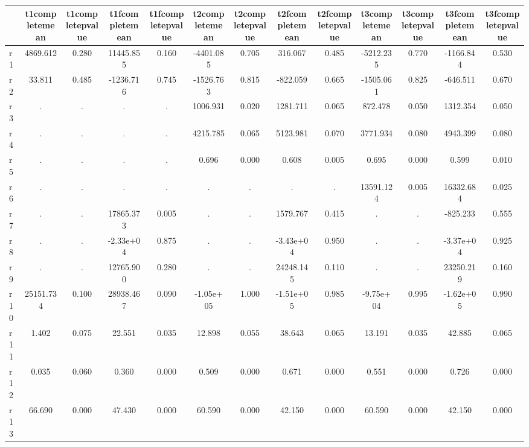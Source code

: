 \begin{table}[htbp]
\begin{tabular}{lcccccccccccc} \hline \hline
 & t1completemean  & t1completepvalue  & t1fcompletemean  & t1fcompletepvalue  & t2completemean  & t2completepvalue  & t2fcompletemean  & t2fcompletepvalue  & t3completemean  & t3completepvalue  & t3fcompletemean  & t3fcompletepvalue  \\  \hline 
r1 &  4869.612 &     0.280 & 11445.855 &     0.160 & -4401.085 &     0.705 &   316.067 &     0.485 & -5212.235 &     0.770 & -1166.844 &     0.530 \\  
r2 &    33.811 &     0.485 & -1236.716 &     0.745 & -1526.763 &     0.815 &  -822.059 &     0.665 & -1505.061 &     0.825 &  -646.511 &     0.670 \\  
r3 &         . &         . &         . &         . &  1006.931 &     0.020 &  1281.711 &     0.065 &   872.478 &     0.050 &  1312.354 &     0.050 \\  
r4 &         . &         . &         . &         . &  4215.785 &     0.065 &  5123.981 &     0.070 &  3771.934 &     0.080 &  4943.399 &     0.080 \\  
r5 &         . &         . &         . &         . &     0.696 &     0.000 &     0.608 &     0.005 &     0.695 &     0.000 &     0.599 &     0.010 \\  
r6 &         . &         . &         . &         . &         . &         . &         . &         . & 13591.124 &     0.005 & 16332.684 &     0.025 \\  
r7 &         . &         . & 17865.373 &     0.005 &         . &         . &  1579.767 &     0.415 &         . &         . &  -825.233 &     0.555 \\  
r8 &         . &         . & -2.33e+04 &     0.875 &         . &         . & -3.43e+04 &     0.950 &         . &         . & -3.37e+04 &     0.925 \\  
r9 &         . &         . & 12765.900 &     0.280 &         . &         . & 24248.145 &     0.110 &         . &         . & 23250.219 &     0.160 \\  
r10 & 25151.734 &     0.100 & 28938.467 &     0.090 & -1.05e+05 &     1.000 & -1.51e+05 &     0.985 & -9.75e+04 &     0.995 & -1.62e+05 &     0.990 \\  
r11 &     1.402 &     0.075 &    22.551 &     0.035 &    12.898 &     0.055 &    38.643 &     0.065 &    13.191 &     0.035 &    42.885 &     0.065 \\  
r12 &     0.035 &     0.060 &     0.360 &     0.000 &     0.509 &     0.000 &     0.671 &     0.000 &     0.551 &     0.000 &     0.726 &     0.000 \\  
r13 &    66.690 &     0.000 &    47.430 &     0.000 &    60.590 &     0.000 &    42.150 &     0.000 &    60.590 &     0.000 &    42.150 &     0.000 \\  
\hline \hline \end{tabular}
\end{table}
